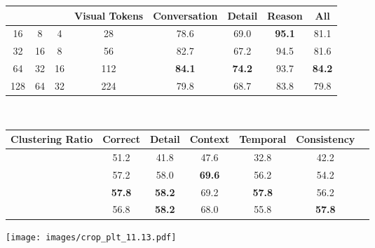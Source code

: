 \documentclass[10pt,twocolumn,letterpaper]{article}
\begin{document}
\begin{table*}[t]
\footnotesize
\begin{minipage}[b]{0.48\textwidth}
\centering
\setlength{\tabcolsep}{3.2pt}
{
\begin{tabular}{ccc|c|cccc}
\toprule[.9pt]
\bm{} &\bm{} & \bm{} & \textbf{Visual Tokens} &{\textbf{Conversation}} & {\textbf{Detail}} & {\textbf{Reason}} & {\textbf{All}} \\ \midrule
 16 & 8 & 4 & 28 & 78.6 & 69.0 & \bf{95.1} & 81.1 \\  
 32 & 16 & 8 & 56 & 82.7 & 67.2 & 94.5 & 81.6 \\  
 \rowcolor{aliceblue!60} 64 & 32 & 16 & 112 & \bf{84.1} & \bf{74.2} & 93.7 & \bf{84.2} \\ 
 128 & 64 & 32 & 224 & 79.8 & 68.7 & 83.8 & 79.8 \\ 
\bottomrule[.9pt]
\end{tabular}
\vspace{-.6em}
\caption{\textbf{Ablation study about the number of spatial visual clusters.} ``'', ``'', and ``'' denote the number of clusters at the first step, the second step, and the last step, respectively.}
\label{tab:ab_clu}
}
\end{minipage}
\hfill
\quad
\
\begin{minipage}[b]{0.5\textwidth}
\centering
\setlength{\tabcolsep}{3.2pt}
{
\begin{tabular}{ccccccc}
\toprule[.9pt]
 {\textbf{Clustering Ratio}} & {\textbf{Correct}} & {\textbf{Detail}} &{\textbf{Context}} & {\textbf{Temporal}} & {\textbf{Consistency}} \\ \midrule
  & 51.2 & 41.8 & 47.6 & 32.8 & 42.2 \\ 
  & 57.2 & 58.0 & \bf{69.6} & 56.2 & 54.2 \\
 \rowcolor{aliceblue!60}  & \bf{57.8} & \bf{58.2} & 69.2 & \bf{57.8} & 56.2 \\ 
  & 56.8 & \bf{58.2} & 68.0 & 55.8 & \bf{57.8} \\
\bottomrule[.9pt]
\end{tabular}
\vspace{-.6em}
\caption{\textbf{Ablation study about the number of temporal visual clusters.} ``'' is the frame length. ``'' denotes that the model directly consolidates all frames into a single event.}
\label{tab:ab_event}
}
\end{minipage}
\hfill
\vspace{-1.4em}
\end{table*}

\begin{figure*}[ht]
\centering
\texttt{[image: images/crop\_plt\_11.13.pdf]}
\vspace{-1.5em}
\caption{\textbf{Human evaluations.} In 30 image conversation scenarios and 30 video conversation scenarios, the evaluators rate the model on a scale of 0 to 10 based on its multimodal conversation performance. Finally, we use the average score as the final model score.}
\label{fig:user_study}
\vspace{-.8em}
\end{figure*}
\end{document}
